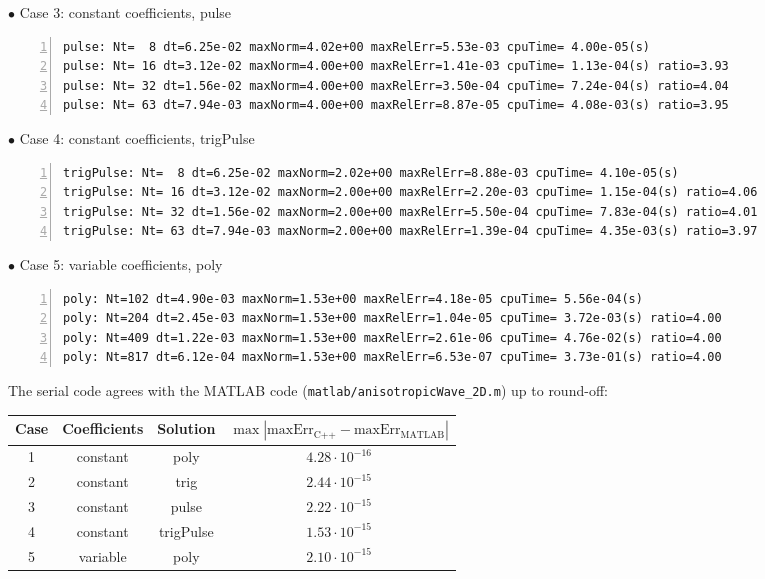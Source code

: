 \documentclass[11pt]{article}
\begin{document}
$\bullet$ Case 3: constant coefficients, pulse
\begin{Verbatim}[fontsize=\footnotesize,formatcom=\color{blue},frame=single,framerule=1pt,numbers=left]
pulse: Nt=  8 dt=6.25e-02 maxNorm=4.02e+00 maxRelErr=5.53e-03 cpuTime= 4.00e-05(s)
pulse: Nt= 16 dt=3.12e-02 maxNorm=4.00e+00 maxRelErr=1.41e-03 cpuTime= 1.13e-04(s) ratio=3.93
pulse: Nt= 32 dt=1.56e-02 maxNorm=4.00e+00 maxRelErr=3.50e-04 cpuTime= 7.24e-04(s) ratio=4.04
pulse: Nt= 63 dt=7.94e-03 maxNorm=4.00e+00 maxRelErr=8.87e-05 cpuTime= 4.08e-03(s) ratio=3.95
\end{Verbatim}

$\bullet$ Case 4: constant coefficients, trigPulse
\begin{Verbatim}[fontsize=\footnotesize,formatcom=\color{blue},frame=single,framerule=1pt,numbers=left]
trigPulse: Nt=  8 dt=6.25e-02 maxNorm=2.02e+00 maxRelErr=8.88e-03 cpuTime= 4.10e-05(s)
trigPulse: Nt= 16 dt=3.12e-02 maxNorm=2.00e+00 maxRelErr=2.20e-03 cpuTime= 1.15e-04(s) ratio=4.06
trigPulse: Nt= 32 dt=1.56e-02 maxNorm=2.00e+00 maxRelErr=5.50e-04 cpuTime= 7.83e-04(s) ratio=4.01
trigPulse: Nt= 63 dt=7.94e-03 maxNorm=2.00e+00 maxRelErr=1.39e-04 cpuTime= 4.35e-03(s) ratio=3.97
\end{Verbatim}

$\bullet$ Case 5: variable coefficients, poly
\begin{Verbatim}[fontsize=\footnotesize,formatcom=\color{blue},frame=single,framerule=1pt,numbers=left]
poly: Nt=102 dt=4.90e-03 maxNorm=1.53e+00 maxRelErr=4.18e-05 cpuTime= 5.56e-04(s)
poly: Nt=204 dt=2.45e-03 maxNorm=1.53e+00 maxRelErr=1.04e-05 cpuTime= 3.72e-03(s) ratio=4.00
poly: Nt=409 dt=1.22e-03 maxNorm=1.53e+00 maxRelErr=2.61e-06 cpuTime= 4.76e-02(s) ratio=4.00
poly: Nt=817 dt=6.12e-04 maxNorm=1.53e+00 maxRelErr=6.53e-07 cpuTime= 3.73e-01(s) ratio=4.00
\end{Verbatim}

The serial code agrees with the MATLAB code (\texttt{matlab/anisotropicWave\_2D.m}) up to round-off:
\begin{table}[H]\footnotesize
\begin{center}
\begin{tabular}{|c|c|c|c|} \hline
Case & Coefficients & Solution & $\max|\mbox{maxErr}_{\text{C++}}-\mbox{maxErr}_{\text{MATLAB}}|$ \\ \hline
1 & constant & poly      & $4.28\cdot 10^{-16}$ \\
2 & constant & trig      & $2.44\cdot 10^{-15}$ \\
3 & constant & pulse     & $2.22\cdot 10^{-15}$ \\
4 & constant & trigPulse & $1.53\cdot 10^{-15}$ \\
5 & variable & poly      & $2.10\cdot 10^{-15}$ \\ \hline
\end{tabular}
\end{center}
\end{table}
\end{document}

